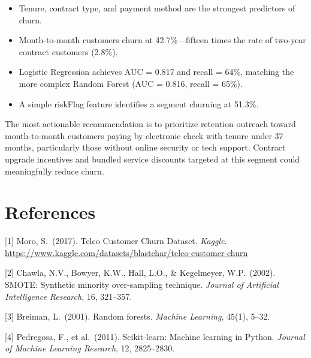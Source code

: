\documentclass{article}
\begin{document}
\begin{itemize}
  \item Tenure, contract type, and payment method are the strongest
        predictors of churn.
  \item Month-to-month customers churn at 42.7\%---fifteen times the rate of
        two-year contract customers (2.8\%).
  \item Logistic Regression achieves AUC = 0.817 and recall = 64\%, matching
        the more complex Random Forest (AUC = 0.816, recall = 65\%).
  \item A simple riskFlag feature identifies a segment churning at 51.3\%.
\end{itemize}

The most actionable recommendation is to prioritize retention outreach toward
month-to-month customers paying by electronic check with tenure under 37
months, particularly those without online security or tech support. Contract
upgrade incentives and bundled service discounts targeted at this segment
could meaningfully reduce churn.

\section*{References}

{
\small

[1] Moro, S.\ (2017). Telco Customer Churn Dataset. \textit{Kaggle}.
\url{https://www.kaggle.com/datasets/blastchar/telco-customer-churn}

[2] Chawla, N.V., Bowyer, K.W., Hall, L.O., \& Kegelmeyer, W.P.\ (2002).
SMOTE: Synthetic minority over-sampling technique. \textit{Journal of
Artificial Intelligence Research}, 16, 321--357.

[3] Breiman, L.\ (2001). Random forests. \textit{Machine Learning},
45(1), 5--32.

[4] Pedregosa, F., et al.\ (2011). Scikit-learn: Machine learning in Python.
\textit{Journal of Machine Learning Research}, 12, 2825--2830.

}
\end{document}
